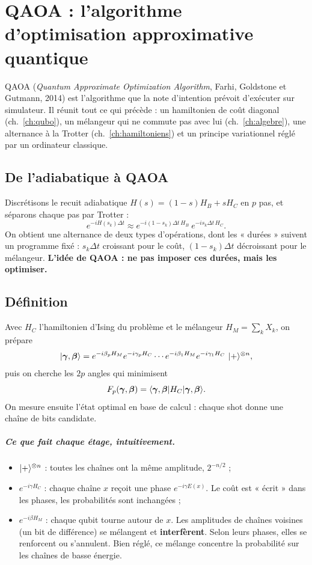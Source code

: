 \chapter{QAOA : l'algorithme d'optimisation approximative quantique}\label{ch:qaoa}

QAOA (\emph{Quantum Approximate Optimization Algorithm}, Farhi, Goldstone et Gutmann, 2014) est l'algorithme que la note d'intention prévoit d'exécuter sur simulateur. Il réunit tout ce qui précède : un hamiltonien de coût diagonal (ch.~\ref{ch:qubo}), un mélangeur qui ne commute pas avec lui (ch.~\ref{ch:algebre}), une alternance à la Trotter (ch.~\ref{ch:hamiltoniens}) et un principe variationnel réglé par un ordinateur classique.

\section{De l'adiabatique à QAOA}
Discrétisons le recuit adiabatique $H(s)=(1-s)H_B+sH_C$ en $p$ pas, et séparons chaque pas par Trotter :
\[e^{-iH(s_k)\Delta t}\approx e^{-i(1-s_k)\Delta t\,H_B}\ e^{-is_k\Delta t\,H_C}.\]
On obtient une alternance de deux types d'opérations, dont les « durées » suivent un programme fixé : $s_k\Delta t$ croissant pour le coût, $(1-s_k)\Delta t$ décroissant pour le mélangeur. \textbf{L'idée de QAOA : ne pas imposer ces durées, mais les optimiser.}

\section{Définition}
\begin{definition}
Avec $H_C$ l'hamiltonien d'Ising du problème et le mélangeur $H_M=\sum_kX_k$, on prépare
\[\lvert \boldsymbol\gamma,\boldsymbol\beta\rangle=e^{-i\beta_pH_M}e^{-i\gamma_pH_C}\cdots e^{-i\beta_1H_M}e^{-i\gamma_1H_C}\ \lvert +\rangle^{\otimes n},\]
puis on cherche les $2p$ angles qui minimisent
\[F_p(\boldsymbol\gamma,\boldsymbol\beta)=\langle \boldsymbol\gamma,\boldsymbol\beta\rvert H_C\lvert \boldsymbol\gamma,\boldsymbol\beta\rangle.\]
On mesure ensuite l'état optimal en base de calcul : chaque shot donne une chaîne de bits candidate.
\end{definition}
\paragraph{Ce que fait chaque étage, intuitivement.}
\begin{itemize}
\item $\lvert +\rangle^{\otimes n}$ : toutes les chaînes ont la même amplitude, $2^{-n/2}$ ;
\item $e^{-i\gamma H_C}$ : chaque chaîne $x$ reçoit une phase $e^{-i\gamma E(x)}$. Le coût est « écrit » dans les phases, les probabilités sont inchangées ;
\item $e^{-i\beta H_M}$ : chaque qubit tourne autour de $x$. Les amplitudes de chaînes voisines (un bit de différence) se mélangent et \textbf{interfèrent}. Selon leurs phases, elles se renforcent ou s'annulent. Bien réglé, ce mélange concentre la probabilité sur les chaînes de basse énergie.
\end{itemize}
